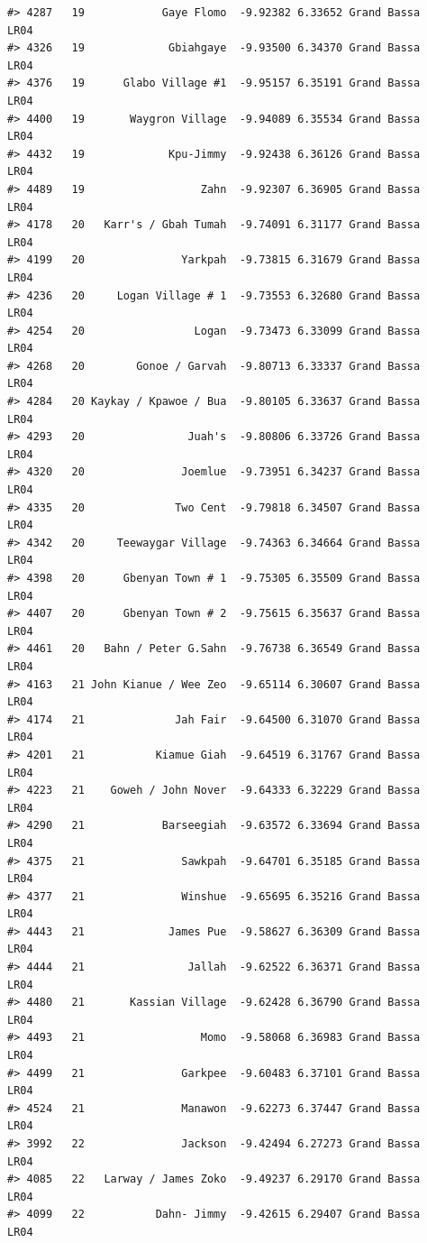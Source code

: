 \documentclass[12pt,a4paper]{book}
\theoremstyle{definition}
\theoremstyle{definition}
\theoremstyle{definition}
\theoremstyle{remark}
\begin{document}
\begin{verbatim}
#> 4287   19            Gaye Flomo  -9.92382 6.33652 Grand Bassa       LR04
#> 4326   19             Gbiahgaye  -9.93500 6.34370 Grand Bassa       LR04
#> 4376   19      Glabo Village #1  -9.95157 6.35191 Grand Bassa       LR04
#> 4400   19       Waygron Village  -9.94089 6.35534 Grand Bassa       LR04
#> 4432   19             Kpu-Jimmy  -9.92438 6.36126 Grand Bassa       LR04
#> 4489   19                  Zahn  -9.92307 6.36905 Grand Bassa       LR04
#> 4178   20   Karr's / Gbah Tumah  -9.74091 6.31177 Grand Bassa       LR04
#> 4199   20               Yarkpah  -9.73815 6.31679 Grand Bassa       LR04
#> 4236   20     Logan Village # 1  -9.73553 6.32680 Grand Bassa       LR04
#> 4254   20                 Logan  -9.73473 6.33099 Grand Bassa       LR04
#> 4268   20        Gonoe / Garvah  -9.80713 6.33337 Grand Bassa       LR04
#> 4284   20 Kaykay / Kpawoe / Bua  -9.80105 6.33637 Grand Bassa       LR04
#> 4293   20                Juah's  -9.80806 6.33726 Grand Bassa       LR04
#> 4320   20               Joemlue  -9.73951 6.34237 Grand Bassa       LR04
#> 4335   20              Two Cent  -9.79818 6.34507 Grand Bassa       LR04
#> 4342   20     Teewaygar Village  -9.74363 6.34664 Grand Bassa       LR04
#> 4398   20      Gbenyan Town # 1  -9.75305 6.35509 Grand Bassa       LR04
#> 4407   20      Gbenyan Town # 2  -9.75615 6.35637 Grand Bassa       LR04
#> 4461   20   Bahn / Peter G.Sahn  -9.76738 6.36549 Grand Bassa       LR04
#> 4163   21 John Kianue / Wee Zeo  -9.65114 6.30607 Grand Bassa       LR04
#> 4174   21              Jah Fair  -9.64500 6.31070 Grand Bassa       LR04
#> 4201   21           Kiamue Giah  -9.64519 6.31767 Grand Bassa       LR04
#> 4223   21    Goweh / John Nover  -9.64333 6.32229 Grand Bassa       LR04
#> 4290   21            Barseegiah  -9.63572 6.33694 Grand Bassa       LR04
#> 4375   21               Sawkpah  -9.64701 6.35185 Grand Bassa       LR04
#> 4377   21               Winshue  -9.65695 6.35216 Grand Bassa       LR04
#> 4443   21             James Pue  -9.58627 6.36309 Grand Bassa       LR04
#> 4444   21                Jallah  -9.62522 6.36371 Grand Bassa       LR04
#> 4480   21       Kassian Village  -9.62428 6.36790 Grand Bassa       LR04
#> 4493   21                  Momo  -9.58068 6.36983 Grand Bassa       LR04
#> 4499   21               Garkpee  -9.60483 6.37101 Grand Bassa       LR04
#> 4524   21               Manawon  -9.62273 6.37447 Grand Bassa       LR04
#> 3992   22               Jackson  -9.42494 6.27273 Grand Bassa       LR04
#> 4085   22   Larway / James Zoko  -9.49237 6.29170 Grand Bassa       LR04
#> 4099   22           Dahn- Jimmy  -9.42615 6.29407 Grand Bassa       LR04

\end{verbatim}
\end{document}
